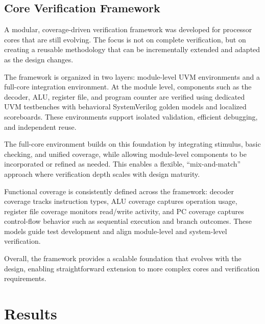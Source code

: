 \documentclass[conference]{IEEEtran}
\begin{document}
    \subsection{Core Verification Framework}
        A modular, coverage-driven verification framework was developed for processor cores that are still evolving. The focus is not on complete verification, but on creating a reusable methodology that can be incrementally extended and adapted as the design changes.
        
        The framework is organized in two layers: module-level UVM environments and a full-core integration environment. At the module level, components such as the decoder, ALU, register file, and program counter are verified using dedicated UVM testbenches with behavioral SystemVerilog golden models and localized scoreboards. These environments support isolated validation, efficient debugging, and independent reuse.
        
        The full-core environment builds on this foundation by integrating stimulus, basic checking, and unified coverage, while allowing module-level components to be incorporated or refined as needed. This enables a flexible, “mix-and-match” approach where verification depth scales with design maturity.
        
        Functional coverage is consistently defined across the framework: decoder coverage tracks instruction types, ALU coverage captures operation usage, register file coverage monitors read/write activity, and PC coverage captures control-flow behavior such as sequential execution and branch outcomes. These models guide test development and align module-level and system-level verification.
        
        Overall, the framework provides a scalable foundation that evolves with the design, enabling straightforward extension to more complex cores and verification requirements.
\section{Results}
\end{document}
